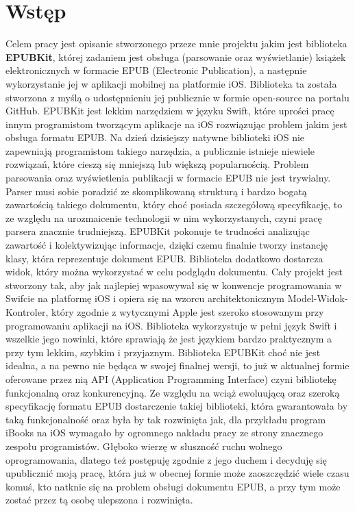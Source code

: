 \chapter{Wstęp}

Celem pracy jest opisanie stworzonego przeze mnie projektu jakim jest biblioteka \textbf{EPUBKit}, której zadaniem jest obsługa (parsowanie oraz wyświetlanie) książek elektronicznych w formacie EPUB (Electronic Publication), a następnie wykorzystanie jej w aplikacji mobilnej na platformie iOS. Biblioteka ta została stworzona z myślą o udostępnieniu jej publicznie w formie open-source na portalu GitHub. EPUBKit jest lekkim narzędziem w języku Swift, które uprości pracę innym programistom tworzącym aplikacje na iOS rozwiązując problem jakim jest obsługa formatu EPUB. Na dzień dzisiejszy natywne biblioteki iOS nie zapewniają programistom takiego narzędzia, a publicznie istnieje niewiele rozwiązań, które cieszą się mniejszą lub większą popularnością. Problem parsowania oraz wyświetlenia publikacji w formacie EPUB nie jest trywialny. Parser musi sobie poradzić ze skomplikowaną strukturą i bardzo bogatą zawartością takiego dokumentu, który choć posiada szczegółową specyfikację, to ze względu na urozmaicenie technologii w nim wykorzystanych, czyni pracę parsera znacznie trudniejszą. EPUBKit pokonuje te trudności analizując zawartość i kolektywizując informacje, dzięki czemu finalnie tworzy instancję klasy, która reprezentuje dokument EPUB. Biblioteka dodatkowo dostarcza widok, który można wykorzystać w celu podglądu dokumentu. Cały projekt jest stworzony tak, aby jak najlepiej wpasowywał się w konwencje programowania w Swifcie na platformę iOS i opiera się na wzorcu architektonicznym Model-Widok-Kontroler, który zgodnie z wytycznymi Apple jest szeroko stosowanym przy programowaniu aplikacji na iOS. Biblioteka wykorzystuje w pełni język Swift i wszelkie jego nowinki, które sprawiają że jest językiem bardzo praktycznym a przy tym lekkim, szybkim i przyjaznym. Biblioteka EPUBKit choć nie jest idealna, a na pewno nie będąca w swojej finalnej wersji, to już w aktualnej formie oferowane przez nią API (Application Programming Interface) czyni bibliotekę funkcjonalną oraz konkurencyjną. Ze względu na wciąż ewoluującą oraz szeroką specyfikację formatu EPUB dostarczenie takiej biblioteki, która gwarantowała by taką funkcjonalność oraz była by tak rozwinięta jak, dla przykładu program iBooks na iOS wymagało by ogromnego nakładu pracy ze strony znacznego zespołu programistów. Głęboko wierzę w słuszność ruchu wolnego oprogramowania, dlatego też postępuję zgodnie z jego duchem i decyduję się upublicznić moją pracę, która już w obecnej formie może zaoszczędzić wiele czasu komuś, kto natknie się na problem obsługi dokumentu EPUB, a przy tym może zostać przez tą osobę ulepszona i rozwinięta.

